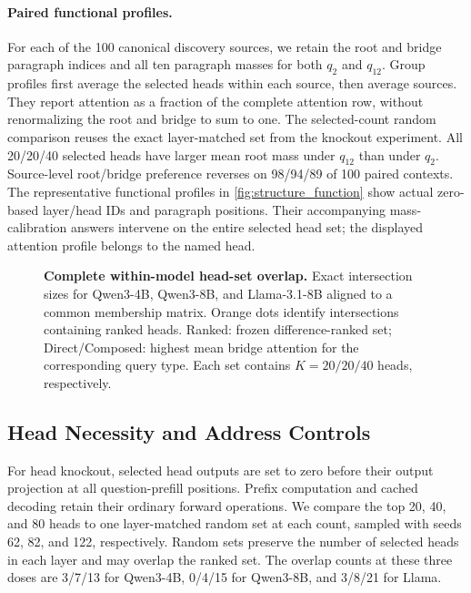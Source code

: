 \paragraph{Paired functional profiles.} For each of the 100 canonical discovery sources, we retain the root and bridge paragraph indices and all ten paragraph masses for both $q_2$ and $q_{12}$. Group profiles first average the selected heads within each source, then average sources. They report attention as a fraction of the complete attention row, without renormalizing the root and bridge to sum to one. The selected-count random comparison reuses the exact layer-matched set from the knockout experiment. All 20/20/40 selected heads have larger mean root mass under $q_{12}$ than under $q_2$. Source-level root/bridge preference reverses on 98/94/89 of 100 paired contexts. The representative functional profiles in \cref{fig:structure_function} show actual zero-based layer/head IDs and paragraph positions. Their accompanying mass-calibration answers intervene on the entire selected head set; the displayed attention profile belongs to the named head.


\begin{figure}[!htbp]
  \centering
  \begin{minipage}{.93\textwidth}\centering
  \par
  \caption{\textbf{Complete within-model head-set overlap.} Exact intersection sizes for Qwen3-4B, Qwen3-8B, and Llama-3.1-8B aligned to a common membership matrix. Orange dots identify intersections containing ranked heads. Ranked: frozen difference-ranked set; Direct/Composed: highest mean bridge attention for the corresponding query type. Each set contains $K=20/20/40$ heads, respectively.}
  \label{fig:head_overlap_all}
\end{minipage}
\end{figure}

\subsection{Head Necessity and Address Controls}

For head knockout, selected head outputs are set to zero before their output projection at all question-prefill positions. Prefix computation and cached decoding retain their ordinary forward operations. We compare the top 20, 40, and 80 heads to one layer-matched random set at each count, sampled with seeds 62, 82, and 122, respectively. Random sets preserve the number of selected heads in each layer and may overlap the ranked set. The overlap counts at these three doses are 3/7/13 for Qwen3-4B, 0/4/15 for Qwen3-8B, and 3/8/21 for Llama.

